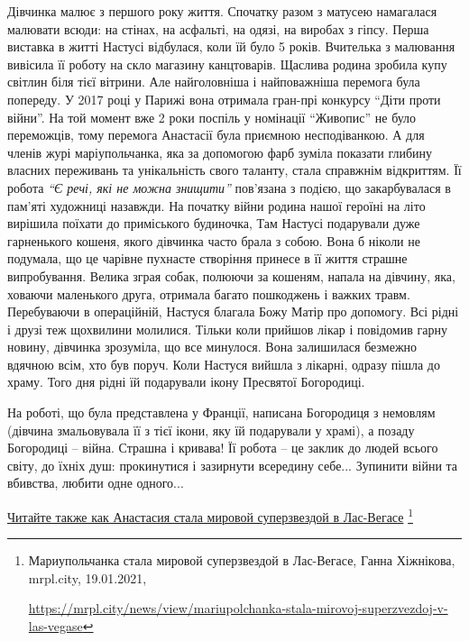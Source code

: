 Дівчинка малює з першого року життя. Спочатку разом з матусею намагалася
малювати всюди: на стінах, на асфальті, на одязі, на виробах з гіпсу. Перша
виставка в житті Настусі відбулася, коли їй було 5 років. Вчителька з малювання
вивісила її роботу на скло магазину канцтоварів. Щаслива родина зробила купу
світлин біля тієї вітрини. Але найголовніша і найповажніша перемога була
попереду. У 2017 році у Парижі вона отримала гран-прі конкурсу \enquote{Діти проти
війни}. На той момент вже 2 роки поспіль у номінації \enquote{Живопис} не було
переможців, тому перемога Анастасії була приємною несподіванкою. А для членів
журі маріупольчанка, яка за допомогою фарб зуміла показати глибину власних
переживань та унікальність свого таланту, стала справжнім відкриттям. Її робота
\emph{\enquote{Є речі, які не можна знищити}} пов'язана з подією, що закарбувалася в пам'яті
художниці назавжди. На початку війни родина нашої героїні на літо вирішила
поїхати до приміського будиночка, Там Настусі подарували дуже гарненького
кошеня, якого дівчинка часто брала з собою. Вона б ніколи не подумала, що це
чарівне пухнасте створіння принесе в її життя страшне випробування. Велика
зграя собак, полюючи за кошеням, напала на дівчину, яка, ховаючи маленького
друга, отримала багато пошкоджень і важких травм. Перебуваючи в операційній,
Настуся благала Божу Матір про допомогу. Всі рідні і друзі теж щохвилини
молилися. Тільки коли прийшов лікар і повідомив гарну новину, дівчинка
зрозуміла, що все минулося. Вона залишилася безмежно вдячною всім, хто був
поруч. Коли Настуся вийшла з лікарні, одразу пішла до храму. Того дня рідні їй
подарували ікону Пресвятої Богородиці.


На роботі, що була представлена у Франції, написана Богородиця з немовлям
(дівчина змальовувала її з тієї ікони, яку їй подарували у храмі), а позаду
Богородиці – війна. Страшна і кривава! Її робота – це заклик до людей всього
світу, до їхніх душ: прокинутися і зазирнути всередину себе... Зупинити війни та
вбивства, любити одне одного...

\href{https://mrpl.city/news/view/mariupolchanka-stala-mirovoj-superzvezdoj-v-las-vegase}{%
Читайте также как Анастасия стала мировой суперзвездой в Лас-Вегасе}%
\footnote{Мариупольчанка стала мировой суперзвездой в Лас-Вегасе, Ганна Хіжнікова, mrpl.city, 19.01.2021, \par%
\url{https://mrpl.city/news/view/mariupolchanka-stala-mirovoj-superzvezdoj-v-las-vegase}
}

